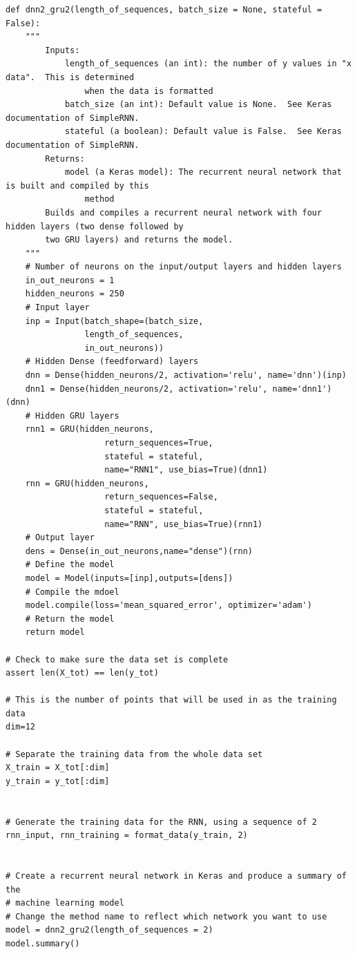 \documentclass[%
oneside,                 %
final,                   %
10pt]{article}
\begin{document}
\begin{verbatim}
def dnn2_gru2(length_of_sequences, batch_size = None, stateful = False):
    """
        Inputs:
            length_of_sequences (an int): the number of y values in "x data".  This is determined
                when the data is formatted
            batch_size (an int): Default value is None.  See Keras documentation of SimpleRNN.
            stateful (a boolean): Default value is False.  See Keras documentation of SimpleRNN.
        Returns:
            model (a Keras model): The recurrent neural network that is built and compiled by this
                method
        Builds and compiles a recurrent neural network with four hidden layers (two dense followed by
        two GRU layers) and returns the model.
    """    
    # Number of neurons on the input/output layers and hidden layers
    in_out_neurons = 1
    hidden_neurons = 250
    # Input layer
    inp = Input(batch_shape=(batch_size, 
                length_of_sequences, 
                in_out_neurons)) 
    # Hidden Dense (feedforward) layers
    dnn = Dense(hidden_neurons/2, activation='relu', name='dnn')(inp)
    dnn1 = Dense(hidden_neurons/2, activation='relu', name='dnn1')(dnn)
    # Hidden GRU layers
    rnn1 = GRU(hidden_neurons, 
                    return_sequences=True,
                    stateful = stateful,
                    name="RNN1", use_bias=True)(dnn1)
    rnn = GRU(hidden_neurons, 
                    return_sequences=False,
                    stateful = stateful,
                    name="RNN", use_bias=True)(rnn1)
    # Output layer
    dens = Dense(in_out_neurons,name="dense")(rnn)
    # Define the model
    model = Model(inputs=[inp],outputs=[dens])
    # Compile the mdoel
    model.compile(loss='mean_squared_error', optimizer='adam')  
    # Return the model
    return model

# Check to make sure the data set is complete
assert len(X_tot) == len(y_tot)

# This is the number of points that will be used in as the training data
dim=12

# Separate the training data from the whole data set
X_train = X_tot[:dim]
y_train = y_tot[:dim]


# Generate the training data for the RNN, using a sequence of 2
rnn_input, rnn_training = format_data(y_train, 2)


# Create a recurrent neural network in Keras and produce a summary of the 
# machine learning model
# Change the method name to reflect which network you want to use
model = dnn2_gru2(length_of_sequences = 2)
model.summary()


\end{verbatim}
\end{document}
